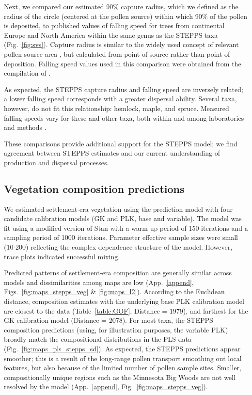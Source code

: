 \documentclass[12pt]{article}
\begin{document}
Next, we compared our estimated 90\% capture radius, which we defined
as the radius of the circle (centered at the pollen source) within
which 90\% of the pollen is deposited, to published values of falling
speed for trees from continental Europe and North America within the
same genus as the STEPPS taxa (Fig.~\ref{fig:svs}). Capture radius is
similar to the widely used concept of relevant pollen source area
\citep{sugita1994pollen}, but calculated from point of source rather
than point of deposition. Falling speed values used in this comparison
were obtained from the compilation of \citet{jackson1999pollen}.

As expected, the STEPPS capture radius and falling speed are inversely
related; a lower falling speed corresponds with a greater dispersal
ability. Several taxa, however, do not fit this relationship: hemlock,
maple, and spruce. Measured falling speeds vary for these and other
taxa, both within and among laboratories and methods
\citep{jackson1999pollen}.

These comparisons provide additional support for the STEPPS model; we
find agreement between STEPPS estimates and our current understanding
of production and dispersal processes.

\subsection{Vegetation composition predictions}

We estimated settlement-era vegetation using the prediction model with
four candidate calibration models (GK and PLK, base and variable). The
model was fit using a modified version of Stan with a warm-up period
of 150 iterations and a sampling period of 1000 iterations. Parameter
effective sample sizes were small (10-200) reflecting the complex
dependence structure of the model. However, trace plots indicated
successful mixing.
                                                                                  
Predicted patterns of settlement-era composition are generally similar
across models and dissimilarities among maps are low
(App.~\ref{append}, Figs.~\ref{fig:maps_stepps_veg} \&
\ref{fig:maps_l2}). According to the Euclidean distance, composition
estimates with the underlying base PLK calibration model are closest
to the data (Table~\ref{table:GOF}, Distance = 1979), and farthest for
the GK calibration model (Distance = 2078).  For most taxa, the STEPPS
composition predictions (using, for illustration purposes, the
variable PLK) broadly match the compositional distributions in the PLS
data (Fig.~\ref{fig:maps_pls_stepps_sd}). As expected, the STEPPS
predictions appear smoother; this is a result of the long-range pollen
transport smoothing out local features, but also because of the
limited number of pollen sample sites. Smaller, compositionally unique
regions such as the Minnesota Big Woods are not well resolved by the
model (App.~\ref{append}, Fig.~\ref{fig:maps_stepps_veg}).
\end{document}
